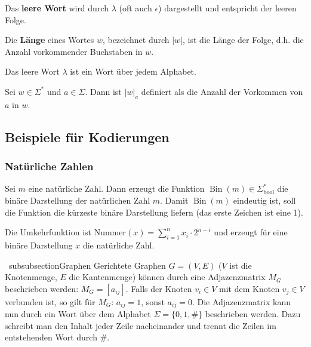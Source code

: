\begin{definition}
Das \textbf{leere Wort} wird durch $\lambda$ (oft auch $\epsilon$) dargestellt und entspricht der leeren Folge.\\
\end{definition}

\begin{definition}
Die \textbf{Länge} eines Wortes $w$, bezeichnet durch $|w|$, ist die Länge der Folge, d.h. die Anzahl vorkommender Buchstaben in $w$.\\
\end{definition}

\begin{remark}
Das leere Wort $\lambda$ ist ein Wort über jedem Alphabet.\\
\end{remark}

\begin{definition}
Sei $w \in \Sigma^*$ und $a \in \Sigma$. Dann ist $|w|_a$ definiert als die Anzahl der Vorkommen von $a$ in $w$.
\end{definition}


\subsection{Beispiele für Kodierungen}
\subsubsection{Natürliche Zahlen}
Sei $m$ eine natürliche Zahl. Dann erzeugt die Funktion $\operatorname{Bin}(m) \in \Sigma_\text{bool}^*$ die binäre Darstellung der natürlichen Zahl $m$. Damit $\operatorname{Bin}(m)$ eindeutig ist, soll die Funktion die kürzeste binäre Darstellung liefern (das erste Zeichen ist eine 1).

Die Umkehrfunktion ist $\text{Nummer}(x) = \sum_{i = 1}^n x_i \cdot 2^{n-i}$ und erzeugt für eine binäre Darstellung $x$ die natürliche Zahl.

\ subsubsection{Graphen}
Gerichtete Graphen $G = (V, E)$ ($V$ ist die Knotenmenge, $E$ die Kantenmenge) können durch eine Adjazenzmatrix $M_G$ beschrieben werden: $M_G = [a_{ij}]$. Falls der Knoten $v_i \in V$ mit dem Knoten $v_j \in V$ verbunden ist, so gilt für $M_G$: $a_{ij} = 1$, sonst $a_{ij} = 0$. Die Adjazenzmatrix kann nun durch ein Wort über dem Alphabet $\Sigma = \{0, 1, \#\}$ beschrieben werden. Dazu schreibt man den Inhalt jeder Zeile nacheinander und trennt die Zeilen im entstehenden Wort durch $\#$.

